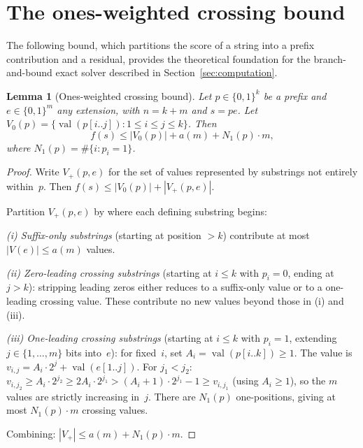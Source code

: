 \documentclass[11pt,a4paper]{article}
\theoremstyle{plain}
\newtheorem{lemma}[theorem]{Lemma}
\theoremstyle{definition}
\theoremstyle{remark}
\newcommand{\val}{\operatorname{val}}
\newcommand{\ones}{N_1}
\begin{document}
\section{The ones-weighted crossing bound}\label{sec:crossing}

The following bound, which partitions the score of a string into a
prefix contribution and a residual, provides the theoretical
foundation for the branch-and-bound exact solver described in
Section~\ref{sec:computation}.

\begin{lemma}[Ones-weighted crossing bound]\label{lem:crossing}
  Let $p \in \{0,1\}^k$ be a prefix and
  $e \in \{0,1\}^m$ any extension, with $n = k + m$ and $s = pe$.
  Let $V_0(p) = \{\val(p[i..j]) : 1 \le i \le j \le k\}$.  Then
  \[
    f(s) \le |V_0(p)| + a(m) + \ones(p) \cdot m,
  \]
  where $\ones(p) = \#\{i : p_i = 1\}$.
\end{lemma}

\begin{proof}
  Write $V_+(p,e)$ for the set of values represented by substrings
  not entirely within~$p$.  Then
  $f(s) \le |V_0(p)| + |V_+(p,e)|$.

  Partition $V_+(p,e)$ by where each defining substring begins:

  \textit{(i) Suffix-only substrings} (starting at position $> k$)
  contribute at most $|V(e)| \le a(m)$ values.

  \textit{(ii) Zero-leading crossing substrings} (starting at $i \le k$
  with $p_i = 0$, ending at $j > k$):  stripping leading zeros either
  reduces to a suffix-only value or to a one-leading crossing value.
  These contribute no new values beyond those in (i) and (iii).

  \textit{(iii) One-leading crossing substrings} (starting at $i \le k$
  with $p_i = 1$, extending $j \in \{1,\ldots,m\}$ bits into~$e$):
  for fixed~$i$, set $A_i = \val(p[i..k]) \ge 1$.  The value is
  $v_{i,j} = A_i \cdot 2^j + \val(e[1..j])$.  For $j_1 < j_2$:
  $v_{i,j_2} \ge A_i \cdot 2^{j_2} \ge 2A_i \cdot 2^{j_1}
  > (A_i + 1) \cdot 2^{j_1} - 1 \ge v_{i,j_1}$
  (using $A_i \ge 1$), so the $m$ values are strictly increasing in~$j$.
  There are $\ones(p)$ one-positions, giving at most
  $\ones(p) \cdot m$ crossing values.

  Combining: $|V_+| \le a(m) + \ones(p) \cdot m$.
\end{proof}
\end{document}
